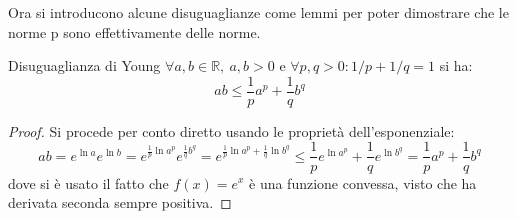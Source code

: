 \documentclass[11pt, a4paper]{scrartcl}
\theoremstyle{definition}
\numberwithin{esempio}{section}
\theoremstyle{definition}
\numberwithin{obs}{section}
\numberwithin{nota}{section}
\numberwithin{equation}{subsection}
\begin{document}
Ora si introducono alcune disuguaglianze come lemmi per poter dimostrare che le norme p sono effettivamente delle norme.
\begin{lemma}
	{Disuguaglianza di Young}{}
	$\forall a,b \in \mathbb{R}, \ a,b>0$ e $\forall p,q>0 : 1 / p + 1 / q = 1$ si ha:
	\[
	ab \le \frac{1}{p}a^p + \frac{1}{q}b^q
	\] 
	\begin{proof}
		Si procede per conto diretto usando le propriet\`a dell'esponenziale:
		\[
				ab = e^{\ln a} e^{\ln b} = e^{\frac{1}{p} \ln a^p} e^{\frac{1}{q} b^q} = e^{\frac{1}{p}\ln a^p + \frac{1}{q} \ln b^q} \le \frac{1}{p}e^{\ln a^p} + \frac{1}{q} e^{\ln b^q}= \frac{1}{p}a^p + \frac{1}{q}b^q
		\] 
		dove si \`e usato il fatto che $f(x) = e^x$ \`e una funzione convessa, visto che ha derivata seconda sempre positiva.
	\end{proof}
\end{lemma}
\end{document}

